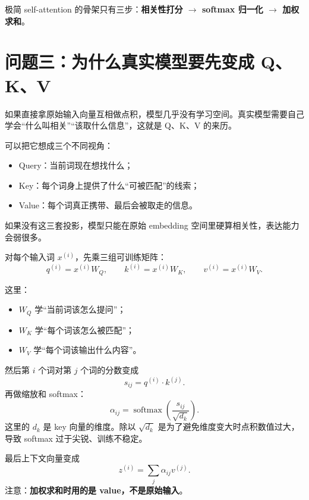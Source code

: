 \documentclass[11pt,a4paper]{ctexart}
\begin{document}
\begin{keypointblock}
极简 self-attention 的骨架只有三步：\textbf{相关性打分 $\rightarrow$ softmax 归一化 $\rightarrow$ 加权求和}。
\end{keypointblock}

\section{问题三：为什么真实模型要先变成 Q、K、V}

\begin{problemblock}
如果直接拿原始输入向量互相做点积，模型几乎没有学习空间。真实模型需要自己学会“什么叫相关”“该取什么信息”，这就是 Q、K、V 的来历。
\end{problemblock}

\begin{intuitionblock}
可以把它想成三个不同视角：
\begin{itemize}
  \item Query：当前词现在想找什么；
  \item Key：每个词身上提供了什么“可被匹配”的线索；
  \item Value：每个词真正携带、最后会被取走的信息。
\end{itemize}
如果没有这三套投影，模型只能在原始 embedding 空间里硬算相关性，表达能力会弱很多。
\end{intuitionblock}

\begin{mathblock}
对每个输入词 \(x^{(i)}\)，先乘三组可训练矩阵：
\[
q^{(i)} = x^{(i)} W_Q,\qquad
k^{(i)} = x^{(i)} W_K,\qquad
v^{(i)} = x^{(i)} W_V.
\]

这里：
\begin{itemize}
  \item \(W_Q\) 学“当前词该怎么提问”；
  \item \(W_K\) 学“每个词该怎么被匹配”；
  \item \(W_V\) 学“每个词该输出什么内容”。
\end{itemize}

然后第 \(i\) 个词对第 \(j\) 个词的分数变成
\[
s_{ij} = q^{(i)} \cdot k^{(j)}.
\]
再做缩放和 softmax：
\[
\alpha_{ij}
=
\operatorname{softmax}\!\left(\frac{s_{ij}}{\sqrt{d_k}}\right).
\]
这里的 \(d_k\) 是 key 向量的维度。除以 \(\sqrt{d_k}\) 是为了避免维度变大时点积数值过大，导致 softmax 过于尖锐、训练不稳定。

最后上下文向量变成
\[
z^{(i)} = \sum_j \alpha_{ij} v^{(j)}.
\]
注意：\textbf{加权求和时用的是 value，不是原始输入}。
\end{mathblock}
\end{document}
